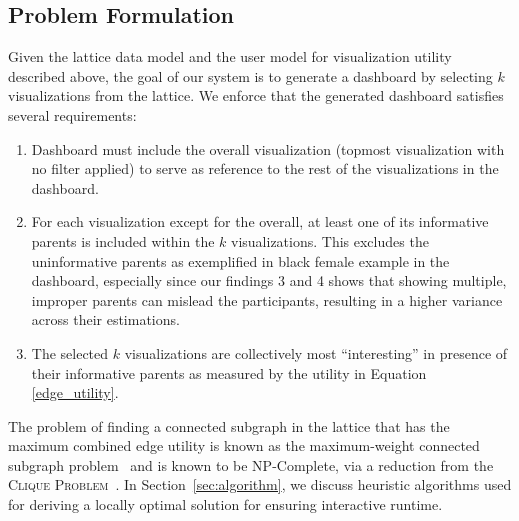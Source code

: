 \subsection{Problem Formulation}
Given the lattice data model and the user model for visualization utility described above, the goal of our system is to generate a dashboard by selecting $k$ visualizations from the lattice. We enforce that the generated dashboard satisfies several requirements:
 \begin{enumerate}
 	\item Dashboard must include the overall visualization (topmost visualization with no filter applied) to serve as reference to the rest of the visualizations in the dashboard.
 	\item For each visualization except for the overall, at least one of its informative parents is included within the $k$ visualizations. This excludes the uninformative parents as exemplified in black female example in the dashboard, especially since our findings 3 and 4 shows that showing multiple, improper parents can mislead the participants, resulting in a higher variance across their estimations. %
 	\item The selected $k$ visualizations are collectively most ``interesting'' in presence of their informative parents as measured by the utility in Equation \ref{edge_utility}.
\end{enumerate}
 The problem of finding a connected subgraph in the lattice that has the maximum combined edge utility is  known as the maximum-weight connected subgraph problem~\cite{ErnstAlthaus2009} and is known to be NP-Complete, via a reduction from the \textsc{Clique Problem}~\cite{Parameswaran2010}. In Section~\ref{sec:algorithm}, we discuss heuristic algorithms used for deriving a locally optimal solution for ensuring interactive runtime.
